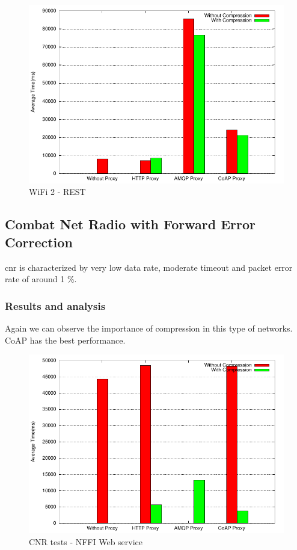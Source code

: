 \begin{figure}[H]
\center
\includegraphics[scale=0.75]{../results/wifi2/rest/result.pdf}
\caption{WiFi 2 - REST}
\end{figure}

\subsection{Combat Net Radio with Forward Error Correction}

\gls{cnr} is characterized by very low data rate, moderate timeout and packet
error rate of around 1 \%.


\subsubsection{Results and analysis}

Again we can observe the importance of compression in this type of networks.
CoAP has the best performance.

\begin{figure}[H]
\center
\includegraphics[scale=0.75]{../results/cnr/nffi/result.pdf}
\caption{CNR tests - NFFI Web service}
\end{figure}

